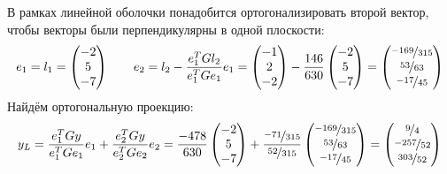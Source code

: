 \documentclass{article}
\begin{document}
\begin{center}
    В рамках линейной оболочки понадобится ортогонализировать второй вектор, чтобы векторы были перпендикулярны в одной плоскости:
    $$e_1 = l_1 = \begin{pmatrix}
        -2 \\ 5 \\ -7
    \end{pmatrix}\qquad
    e_2 = l_2 - \frac{e_1^{T}Gl_2}{e_1^TGe_1}e_1 = \begin{pmatrix}
        -1 \\ 2 \\ -2
    \end{pmatrix} - \frac{146}{630}\begin{pmatrix}
        -2 \\ 5 \\ -7
    \end{pmatrix} = \begin{pmatrix}
        \nicefrac{-169}{315} \\ \nicefrac{53}{63} \\ \nicefrac{-17}{45}
    \end{pmatrix}$$
    Найдём ортогональную проекцию:
    $$
        y_L = \frac{e_1^{T}Gy}{e_1^TGe_1}e_1 +  \frac{e_2^{T}Gy}{e_2^TGe_2}e_2 = \frac{-478}{630}\begin{pmatrix}
            -2 \\ 5 \\ -7
        \end{pmatrix} + \frac{\nicefrac{-71}{315}}{\nicefrac{52}{315}}\begin{pmatrix}
            \nicefrac{-169}{315} \\ \nicefrac{53}{63} \\ \nicefrac{-17}{45}
        \end{pmatrix} = \begin{pmatrix}
            \nicefrac{9}{4} \\ \nicefrac{-257}{52} \\ \nicefrac{303}{52}
        \end{pmatrix}
    $$
\end{center}
\end{document}
